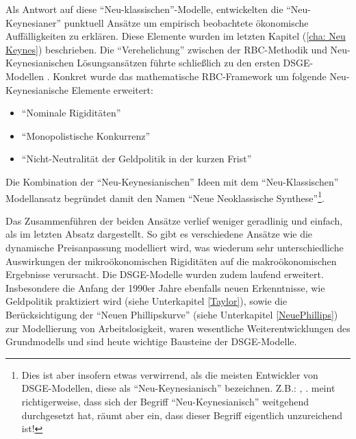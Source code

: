 Als Antwort auf diese "`Neu-klassischen"'-Modelle, entwickelten die "`Neu-Keynesianer"' punktuell Ansätze um empirisch beobachtete ökonomische Auffälligkeiten zu erklären. Diese Elemente wurden im letzten Kapitel (\ref{cha: Neu Keynes}) beschrieben. Die "`Verehelichung"' zwischen der RBC-Methodik und Neu-Keynesianischen Lösungsansätzen führte schließlich zu den ersten DSGE-Modellen \parencite[S. 5]{Gali2015}. Konkret wurde das mathematische RBC-Framework um folgende Neu-Keynesianische Elemente erweitert:
\begin{itemize}
	\item "`Nominale Rigiditäten"'
	\item "`Monopolistische Konkurrenz"'
	\item "`Nicht-Neutralität der Geldpolitik in der kurzen Frist"'   
\end{itemize}

Die Kombination der "`Neu-Keynesianischen"' Ideen mit dem "`Neu-Klassischen"' Modellansatz begründet damit den Namen "`Neue Neoklassische Synthese"'\footnote{Dies ist aber insofern etwas verwirrend, als die meisten Entwickler von DSGE-Modellen, diese als "`Neu-Keynesianisch"' bezeichnen. Z.B.: \textcite{Gali2015}, \textcite{Romer2019}. \textcite[S. 28]{Gali2007} meint richtigerweise, dass sich der Begriff "`Neu-Keynesianisch"' weitgehend durchgesetzt hat, räumt aber ein, dass dieser Begriff eigentlich unzureichend ist!}.

Das Zusammenführen der beiden Ansätze verlief weniger geradlinig und einfach, als im letzten Absatz dargestellt. So gibt es verschiedene Ansätze \parencite[S. 310]{Romer2019} wie die dynamische Preisanpassung modelliert wird, was wiederum sehr unterschiedliche Auswirkungen der mikroökonomischen Rigiditäten auf die makroökonomischen Ergebnisse verursacht. Die DSGE-Modelle wurden zudem laufend erweitert. Insbesondere die Anfang der 1990er Jahre ebenfalls neuen Erkenntnisse, wie Geldpolitik praktiziert wird (siehe Unterkapitel \ref{Taylor}), sowie die Berücksichtigung der "`Neuen Phillipskurve"' (siehe Unterkapitel \ref{NeuePhillips}) zur Modellierung von Arbeitslosigkeit, waren wesentliche Weiterentwicklungen des Grundmodells und sind heute wichtige Bausteine der DSGE-Modelle.

